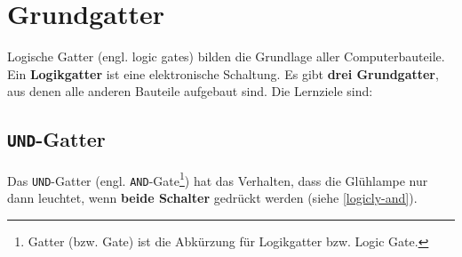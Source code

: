 
\toggletrue{image}
\togglefalse{imagehover}
\toggletrue{imagehover}

\chapter{Grundgatter}
\label{ch:grundgatter}

Logische Gatter (engl. logic gates) bilden die Grundlage aller Computerbauteile. Ein \textbf{Logikgatter} ist eine elektronische Schaltung. Es gibt \textbf{drei Grundgatter}, aus denen alle anderen Bauteile aufgebaut sind. Die Lernziele sind:\\


\vspace{-0.25cm}

\section{\texttt{UND}-Gatter}

Das \texttt{UND}-Gatter (engl. \texttt{AND}-Gate\footnote{Gatter (bzw. Gate) ist die Abkürzung für Logikgatter bzw. Logic Gate.}) hat das Verhalten, dass die Glühlampe nur dann leuchtet, wenn \textbf{beide Schalter} gedrückt werden (siehe \autoref{logicly-and}).

